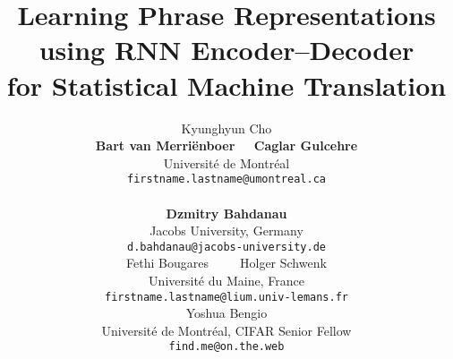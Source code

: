\documentclass[11pt]{article}
\title{Learning Phrase Representations using RNN Encoder--Decoder \\ for
Statistical Machine Translation}
\author{
    Kyunghyun Cho \\ 
    {\bf Bart van Merri\"enboer~ ~Caglar Gulcehre}\\
    Universit\'e de Montr\'eal \\
  {\tt \small firstname.lastname@umontreal.ca} \\
  \And
  ~\\{\bf Dzmitry Bahdanau} \\
    Jacobs University, Germany \\
  {\tt \small d.bahdanau@jacobs-university.de} \\
  \AND
    Fethi Bougares~~~~~Holger Schwenk \\
    Universit\'e du Maine, France \\
  {\tt \small firstname.lastname@lium.univ-lemans.fr} \\
  \And
    Yoshua Bengio \\
    Universit\'e de Montr\'eal, CIFAR Senior Fellow \\
  {\tt \small find.me@on.the.web} \\}
\date{}
\begin{document}
\maketitle







\newpage
\appendix
{
\onecolumn

}
\end{document}
